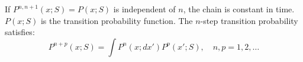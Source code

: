 If $P^{n,n+1}(x; S) = P(x; S)$ is independent of $n$, the chain is constant in time. $P(x; S)$ is the transition probability function. The $n$-step transition probability satisfies:
$$P^{n+p}(x; S) = \int P^n(x; dx') P^p(x'; S), \quad n, p = 1, 2, \ldots$$
